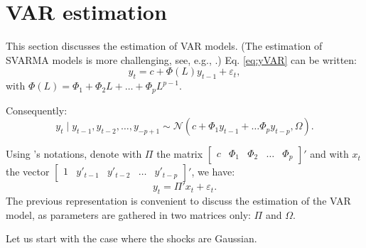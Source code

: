 \documentclass[
  12pt,
]{book}
\theoremstyle{definition}
\theoremstyle{definition}
\theoremstyle{definition}
\theoremstyle{definition}
\theoremstyle{remark}
\begin{document}
\hypertarget{estimVAR}{%
\section{VAR estimation}\label{estimVAR}}

This section discusses the estimation of VAR models. (The estimation of SVARMA models is more challenging, see, e.g., \citet{Gourieroux_Monfort_Renne_2020}.) Eq. \eqref{eq:yVAR} can be written:
\[
y_{t}=c+\Phi(L)y_{t-1}+\varepsilon_{t},
\]
with \(\Phi(L) = \Phi_1 + \Phi_2 L + \dots + \Phi_p L^{p-1}\).

Consequently:
\[
y_{t}\mid y_{t-1},y_{t-2},\ldots,y_{-p+1}\sim \mathcal{N}(c+\Phi_{1}y_{t-1}+\ldots\Phi_{p}y_{t-p},\Omega).
\]

Using \citet{Hamilton_1994}'s notations, denote with \(\Pi\) the matrix \(\left[\begin{array}{ccccc} c & \Phi_{1} & \Phi_{2} & \ldots & \Phi_{p}\end{array}\right]'\) and with \(x_{t}\) the vector \(\left[\begin{array}{ccccc} 1 & y'_{t-1} & y'_{t-2} & \ldots & y'_{t-p}\end{array}\right]'\), we have:
\begin{equation}
y_{t}= \Pi'x_{t} + \varepsilon_{t}. \label{eq:PIVAR}
\end{equation}
The previous representation is convenient to discuss the estimation of the VAR model, as parameters are gathered in two matrices only: \(\Pi\) and \(\Omega\).

Let us start with the case where the shocks are Gaussian.
\end{document}
